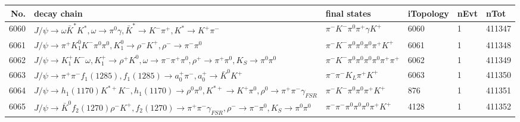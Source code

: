 \begin{table}[htbp] 
\begin{center}
\begin{small}
\begin{tabular}{rlllll}\hline\hline
 No. & decay chain & final states &  iTopology & nEvt & nTot \\\hline
6060&$J/\psi       \rightarrow \omega         \bar{K}^{*}   K^{*}          , \omega          \rightarrow \pi^{0}        \gamma       , \bar{K}^{*}    \rightarrow K^{-}          \pi^{+}        , K^{*}           \rightarrow K^{+}          \pi^{-}        $&$\pi^{-}        K^{-}          \pi^{0}        \pi^{+}        \gamma       K^{+}          $& 6060&    1&411347\\
6061&$J/\psi       \rightarrow \pi^{+}        K_1^{0}        K^{-}          \pi^{0}        \pi^{0}        , K_1^{0}         \rightarrow \rho^{-}      K^{+}          , \rho^{-}       \rightarrow \pi^{-}        \pi^{0}        $&$\pi^{-}        K^{-}          \pi^{0}        \pi^{0}        \pi^{0}        \pi^{+}        K^{+}          $& 6061&    1&411348\\
6062&$J/\psi       \rightarrow K_1^{+}        K^{-}          \omega         , K_1^{+}         \rightarrow \rho^{+}      K^{0}          , \omega          \rightarrow \pi^{-}        \pi^{+}        \pi^{0}        , \rho^{+}       \rightarrow \pi^{+}        \pi^{0}        , K_{S}           \rightarrow \pi^{0}        \pi^{0}        $&$\pi^{-}        K^{-}          \pi^{0}        \pi^{0}        \pi^{0}        \pi^{0}        \pi^{+}        \pi^{+}        $& 6062&    1&411349\\
6063&$J/\psi       \rightarrow \pi^{+}        \pi^{-}        f_{1}(1285)    , f_{1}(1285)     \rightarrow a_{0}^{+}      \pi^{-}        , a_{0}^{+}       \rightarrow \bar{K}^{0}   K^{+}          $&$\pi^{-}        \pi^{-}        K_{L}          \pi^{+}        K^{+}          $& 6063&    1&411350\\
6064&$J/\psi       \rightarrow h_{1}(1170)    K^{*+}         K^{-}          , h_{1}(1170)     \rightarrow \rho^{0}      \pi^{0}        , K^{*+}          \rightarrow K^{+}          \pi^{0}        , \rho^{0}       \rightarrow \pi^{+}        \pi^{-}        \gamma_{FSR} $&$\pi^{-}        K^{-}          \pi^{0}        \pi^{0}        \pi^{+}        K^{+}          $&  876&    1&411351\\
6065&$J/\psi       \rightarrow \bar{K}^{0}   f_{2}(1270)    \rho^{-}      K^{+}          , f_{2}(1270)     \rightarrow \pi^{+}        \pi^{-}        \gamma_{FSR} , \rho^{-}       \rightarrow \pi^{-}        \pi^{0}        , K_{S}           \rightarrow \pi^{0}        \pi^{0}        $&$\pi^{-}        \pi^{-}        \pi^{0}        \pi^{0}        \pi^{0}        \pi^{+}        K^{+}          $& 4128&    1&411352\\

\end{tabular}
\end{small}
\end{center}
\end{table}
